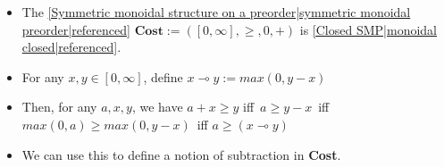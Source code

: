 
\begin{itemize}
    \item The \ref{Symmetric monoidal structure on a preorder|symmetric monoidal preorder|referenced} $\mathbf{Cost}:=([0,\infty],\geq,0,+)$ is \ref{Closed SMP|monoidal closed|referenced}.
    \item For any $x,y \in [0,\infty]$, define $x \multimap y := max(0,y-x)$
    \item Then, for any $a,x,y$, we have $a+x\geq y$ iff \,$a \geq y-x$\, iff \,$max(0,a)\geq max(0,y-x)$\, iff $a \geq (x \multimap y)$
    \item We can use this to define a notion of subtraction in \textbf{Cost}.
  \end{itemize}
